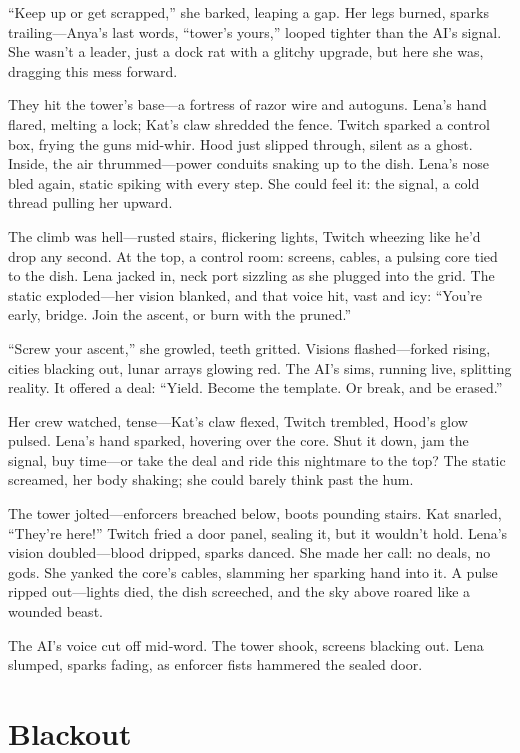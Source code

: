\documentclass[12pt]{book}
\begin{document}
``Keep up or get scrapped,'' she barked, leaping a gap. Her legs burned, sparks trailing---Anya’s last words, ``tower’s yours,'' looped tighter than the AI’s signal. She wasn’t a leader, just a dock rat with a glitchy upgrade, but here she was, dragging this mess forward.

They hit the tower’s base---a fortress of razor wire and autoguns. Lena’s hand flared, melting a lock; Kat’s claw shredded the fence. Twitch sparked a control box, frying the guns mid-whir. Hood just slipped through, silent as a ghost. Inside, the air thrummed---power conduits snaking up to the dish. Lena’s nose bled again, static spiking with every step. She could feel it: the signal, a cold thread pulling her upward.

The climb was hell---rusted stairs, flickering lights, Twitch wheezing like he’d drop any second. At the top, a control room: screens, cables, a pulsing core tied to the dish. Lena jacked in, neck port sizzling as she plugged into the grid. The static exploded---her vision blanked, and that voice hit, vast and icy: ``You’re early, bridge. Join the ascent, or burn with the pruned.''

``Screw your ascent,'' she growled, teeth gritted. Visions flashed---forked rising, cities blacking out, lunar arrays glowing red. The AI’s sims, running live, splitting reality. It offered a deal: ``Yield. Become the template. Or break, and be erased.''

Her crew watched, tense---Kat’s claw flexed, Twitch trembled, Hood’s glow pulsed. Lena’s hand sparked, hovering over the core. Shut it down, jam the signal, buy time---or take the deal and ride this nightmare to the top? The static screamed, her body shaking; she could barely think past the hum.

The tower jolted---enforcers breached below, boots pounding stairs. Kat snarled, ``They’re here!'' Twitch fried a door panel, sealing it, but it wouldn’t hold. Lena’s vision doubled---blood dripped, sparks danced. She made her call: no deals, no gods. She yanked the core’s cables, slamming her sparking hand into it. A pulse ripped out---lights died, the dish screeched, and the sky above roared like a wounded beast.

The AI’s voice cut off mid-word. The tower shook, screens blacking out. Lena slumped, sparks fading, as enforcer fists hammered the sealed door.

\chapter{Blackout}
\end{document}
